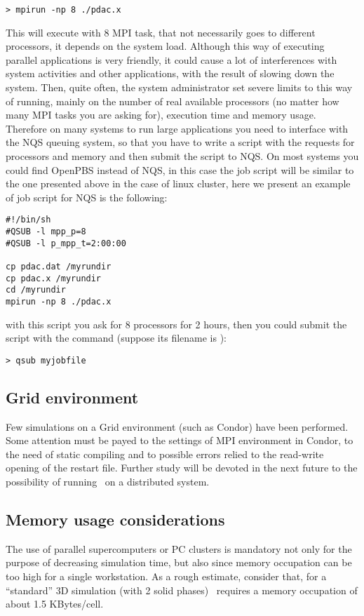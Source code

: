\begin{verbatim}
> mpirun -np 8 ./pdac.x
\end{verbatim}

This will execute  with 8 MPI task, that not necessarily
goes to different processors, it depends on the system load.
Although this way of executing parallel applications is very
friendly, it could cause a lot of interferences with system
activities and other applications, with the result of slowing
down the system. Then, quite often, the system administrator
set severe limits to this way of running, mainly on the number of
real available processors (no matter how many MPI tasks you are asking
for), execution time and memory usage.
Therefore on many systems to run large applications you need to 
interface with the NQS queuing system, so that
you have to write a script with the requests for processors and
memory and then submit the script to NQS. On most systems you
could find OpenPBS instead of NQS, in this case the job script
will be similar to the one presented above in the case of 
linux cluster, here we present an example of job script for 
NQS is the following: 

\begin{verbatim}
#!/bin/sh
#QSUB -l mpp_p=8
#QSUB -l p_mpp_t=2:00:00

cp pdac.dat /myrundir
cp pdac.x /myrundir
cd /myrundir
mpirun -np 8 ./pdac.x
\end{verbatim}

with this script you ask for 8 processors for 2 hours, then
you could submit the script with the command
(suppose its filename is ):

\begin{verbatim}
> qsub myjobfile
\end{verbatim}

\subsection{Grid environment}

Few simulations on a Grid environment (such as Condor) have been performed.
Some attention must be payed to the settings of MPI environment in Condor,
to the need of static compiling and to possible errors relied to the
read-write opening of the restart file. Further study will be devoted in
the next future to the possibility of running \PDAC\ on a distributed
system.

\subsection{Memory usage considerations}
The use of parallel supercomputers or PC clusters is mandatory not only
for the purpose of decreasing simulation time, but also since memory
occupation can be too high for a single workstation. As a rough estimate,
consider that, for a ``standard'' 3D simulation (with 2 solid phases) 
\PDAC\ requires a memory occupation of about 1.5 KBytes/cell. 

